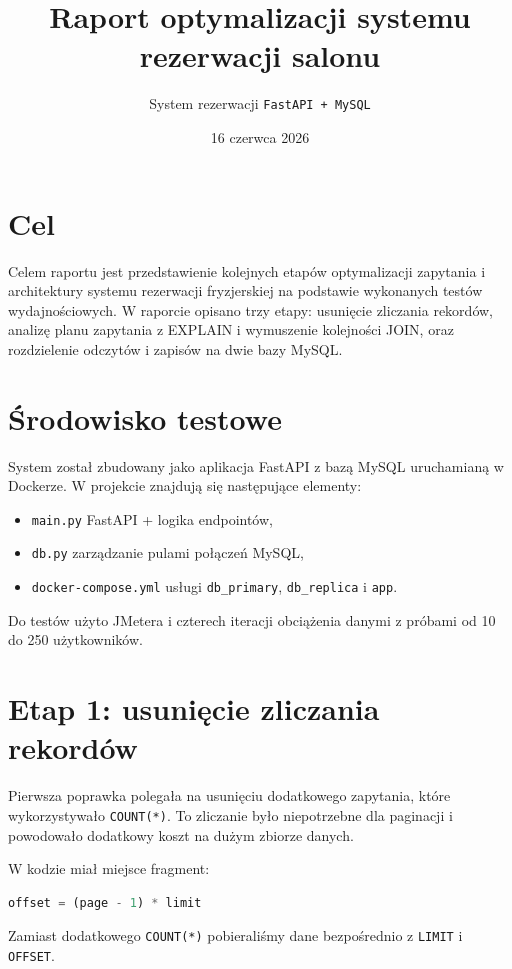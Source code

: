 ﻿\documentclass[a4paper,11pt]{article}
\begin{document}
\title{Raport optymalizacji systemu rezerwacji salonu}
\author{System rezerwacji \texttt{FastAPI + MySQL}}
\date{16 czerwca 2026}
\maketitle
\section{Cel}
Celem raportu jest przedstawienie kolejnych etapów optymalizacji zapytania i architektury systemu rezerwacji fryzjerskiej na podstawie wykonanych testów wydajnościowych. W raporcie opisano trzy etapy: usunięcie zliczania rekordów, analizę planu zapytania z EXPLAIN i wymuszenie kolejności JOIN, oraz rozdzielenie odczytów i zapisów na dwie bazy MySQL.

\section{Środowisko testowe}
System został zbudowany jako aplikacja FastAPI z bazą MySQL uruchamianą w Dockerze. W projekcie znajdują się następujące elementy:
\begin{itemize}
  \item \texttt{main.py} \textendash FastAPI + logika endpointów,
  \item \texttt{db.py} \textendash zarządzanie pulami połączeń MySQL,
  \item \texttt{docker-compose.yml} \textendash usługi \texttt{db\_primary}, \texttt{db\_replica} i \texttt{app}.
\end{itemize}
Do testów użyto JMetera i czterech iteracji obciążenia danymi z próbami od 10 do 250 użytkowników.

\section{Etap 1: usunięcie zliczania rekordów}
Pierwsza poprawka polegała na usunięciu dodatkowego zapytania, które wykorzystywało \texttt{COUNT(*)}. To zliczanie było niepotrzebne dla paginacji i powodowało dodatkowy koszt na dużym zbiorze danych.

W kodzie miał miejsce fragment:
\begin{lstlisting}[language=python]
offset = (page - 1) * limit
\end{lstlisting}

Zamiast dodatkowego \texttt{COUNT(*)} pobieraliśmy dane bezpośrednio z \texttt{LIMIT} i \texttt{OFFSET}.
\end{document}
